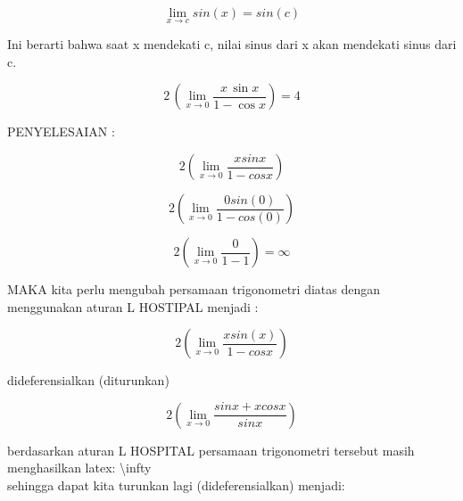 \documentclass[a4paper,10pt]{article}
\begin{document}
\begin{eulernotebook}
\begin{eulercomment}
\begin{eulercomment}
\begin{eulercomment}
\begin{eulercomment}
\begin{eulercomment}
\begin{eulercomment}
\begin{eulercomment}
\begin{eulercomment}
\begin{eulercomment}
\begin{eulercomment}
\begin{eulercomment}
\end{eulercomment}
\begin{eulerformula}
\[
\lim_{x \to c} sin(x) = sin(c)
\]
\end{eulerformula}
\begin{eulercomment}
Ini berarti bahwa saat x mendekati c, nilai sinus dari x akan
mendekati sinus dari c.
\end{eulercomment}
\begin{eulerformula}
\[
2\,\left(\lim_{x\rightarrow 0}{\frac{x\,\sin x}{1-\cos x}}\right)=4
\]
\end{eulerformula}
\begin{eulercomment}
PENYELESAIAN :\\
\end{eulercomment}
\begin{eulerformula}
\[
2( \lim \limits_{x \to 0} \frac{xsinx}{1-cosx} )
\]
\end{eulerformula}
\begin{eulerformula}
\[
2( \lim \limits_{x \to 0} \frac{0sin(0)}{1-cos(0)} )
\]
\end{eulerformula}
\begin{eulerformula}
\[
2( \lim \limits_{x \to 0} \frac{0}{1-1} ) = \infty
\]
\end{eulerformula}
\begin{eulercomment}
MAKA kita perlu mengubah persamaan trigonometri diatas dengan
menggunakan aturan L HOSTIPAL menjadi :\\
\end{eulercomment}
\begin{eulerformula}
\[
2( \lim \limits_{x \to 0} \frac{xsin(x)}{1-cosx} )
\]
\end{eulerformula}
\begin{eulercomment}
dideferensialkan (diturunkan)\\
\end{eulercomment}
\begin{eulerformula}
\[
2( \lim \limits_{x \to 0} \frac{sinx + xcosx}{sinx} )
\]
\end{eulerformula}
\begin{eulercomment}
berdasarkan aturan L HOSPITAL persamaan trigonometri tersebut masih
menghasilkan latex: \textbackslash{}infty  \\
sehingga dapat kita turunkan lagi (dideferensialkan) menjadi:


\end{eulercomment}
\end{eulercomment}
\end{eulercomment}
\end{eulercomment}
\end{eulercomment}
\end{eulercomment}
\end{eulercomment}
\end{eulercomment}
\end{eulercomment}
\end{eulercomment}
\end{eulercomment}
\end{eulernotebook}
\end{document}
